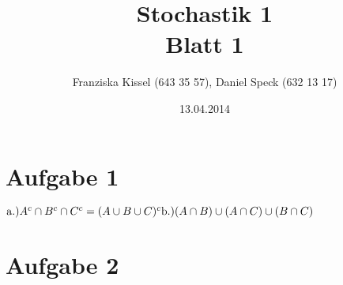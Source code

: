\documentclass[10pt,a4paper]{article}
\title{\textbf{\huge Stochastik 1
\\\large Blatt 1}}
\author{Franziska Kissel (643 35 57), Daniel Speck (632 13 17)}
\date{13.04.2014}
\begin{document}
	\maketitle




	\section*{Aufgabe 1}


		\begin{math}
			\text{a.)}
			\\
			\\
			A^c \cap B^c \cap C^c = ( A \cup B \cup C )^c
			\\
			\\
			\text{b.)}
			\\
			\\
			( A \cap B ) \cup ( A \cap C ) \cup ( B \cap C )
		\end{math}

		\begin{flushright}
						\text{$\Box$}
		\end{flushright}


	\section*{Aufgabe 2}
\end{document}
